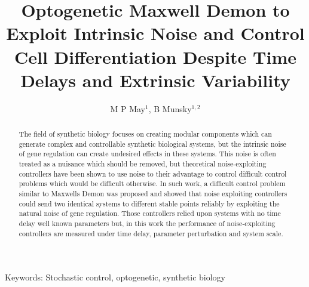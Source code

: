 \documentclass[12pt]{article}
\begin{document}
\title{Optogenetic Maxwell Demon to Exploit Intrinsic Noise and Control Cell Differentiation Despite Time Delays and Extrinsic Variability}
\maketitle

\author{M P May$^1$, B Munsky$^{1,2}$}



\begin{abstract}
The field of synthetic biology focuses on creating modular components which can generate complex and controllable synthetic biological systems, but the intrinsic noise of gene regulation can create undesired effects in these systems. This noise is often treated as a nuisance which should be removed, but theoretical noise-exploiting controllers have been shown to use noise to their advantage to control difficult control problems which would be difficult otherwise. In such work, a difficult control problem similar to Maxwells Demon was proposed and showed that noise exploiting controllers could send two identical systems to different stable points reliably by exploiting the natural noise of gene regulation. Those controllers relied upon systems with no time delay well known parameters but, in this work the performance of noise-exploiting controllers are measured under time delay, parameter perturbation and system scale.

\end{abstract}
Keywords: Stochastic control, optogenetic, synthetic biology

%
%
%
% 
\end{document}
